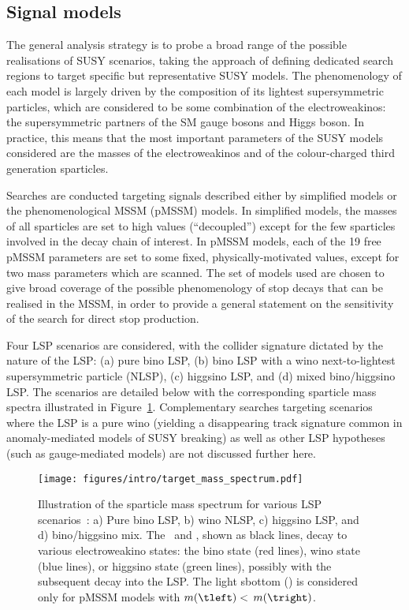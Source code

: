 \documentclass[UKenglish,10pt]{article}
\begin{document}
\subsection{Signal models}
The general analysis strategy is to probe a broad range of the possible realisations of SUSY scenarios, taking the approach of defining dedicated search regions to target specific but representative SUSY models. The phenomenology of each model is largely driven by the composition of its lightest supersymmetric particles, which are considered to be some combination of the electroweakinos: the supersymmetric partners of the SM gauge bosons and Higgs boson. In practice, this means that the most important parameters of the SUSY models considered are the masses of the electroweakinos and of the colour-charged third generation sparticles.
\vspace{0.20cm}

\hspace{-0.60cm}
Searches are conducted targeting signals described either by simplified models or the phenomenological MSSM (pMSSM) models. In simplified models, the masses of all sparticles are set to high values (``decoupled'') except for the few sparticles involved in the decay chain of interest. In pMSSM models, each of the 19 free pMSSM parameters are set to some fixed, physically-motivated values, except for two mass parameters which are scanned. The set of models used are chosen to give broad coverage of the possible phenomenology of stop decays that can be realised in the MSSM, in order to provide a general statement on the sensitivity of the search for direct stop production. 
\vspace{0.20cm}

\hspace{-0.60cm}
Four LSP scenarios are considered, with the collider signature dictated by the nature of the LSP: (a) pure bino LSP, (b) bino LSP with a wino next-to-lightest supersymmetric particle (NLSP), (c) higgsino LSP, and (d) mixed bino/higgsino LSP. The scenarios are detailed below with the corresponding sparticle mass spectra illustrated in Figure~\ref{fig:sparticle_mass_spectrum}. Complementary searches targeting scenarios where the LSP is a pure wino (yielding a disappearing track signature common in anomaly-mediated models of SUSY breaking) as well as other LSP hypotheses (such as gauge-mediated models) are not discussed further here.

\begin{figure}[htbp]
\begin{center}
\texttt{[image: figures/intro/target\_mass\_spectrum.pdf]}
\caption{Illustration of the sparticle mass spectrum for various LSP scenarios~\cite{ATL-CONF-2017-037}:
 a) Pure bino LSP, b) wino NLSP, c) higgsino LSP, and d) bino/higgsino mix. The \tone\ and \bone, shown as black lines, decay to various electroweakino states: the bino state (red lines), wino state (blue lines), or higgsino state (green lines), possibly with the subsequent decay into the LSP. The light sbottom (\bone) is considered only for pMSSM models with $m(\tleft)<$ $m(\tright)$.}
\label{fig:sparticle_mass_spectrum}
\end{center}
\end{figure}
\end{document}
